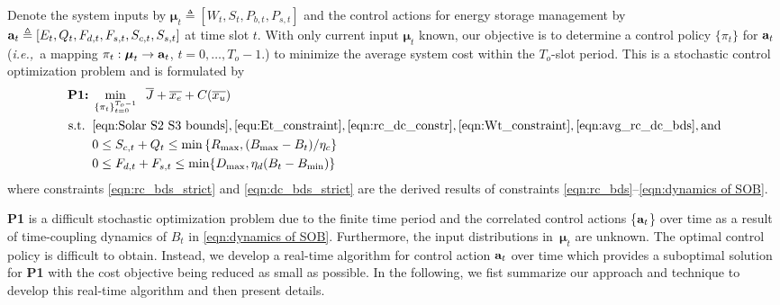 \documentclass[journal]{IEEEtran}
\def\mubf{\boldsymbol \mu }
\def\abf{{\bf a}}
\def\ie{{\it i.e.,\ \/}}
\def\nn{\nonumber}
\begin{document}
Denote the system inputs by $\mubf_t\triangleq[W_t,S_t,P_{b,t},P_{s,t}]$ and the control actions for energy storage management by $\abf_t\triangleq[E_t,Q_t,F_{d,t},F_{s,t},S_{c,t},S_{s,t}]$ at time slot $t$. With only current input  $\mubf_t$ known, our objective is to determine a control policy $\{\pi_t\}$ for  $\abf_t$ (\ie a mapping $\pi_t:\mubf_t\rightarrow \abf_t$, $t=0,\ldots,T_o-1$.) to minimize the average system cost within the $T_o$-slot period. This is a stochastic control optimization problem and is formulated by
\begin{align}
\textrm{\bf P1:}\; &\min_{\{\pi_t\}_{t=0}^{T_o-1}} \;\;
\overline{J}+\overline{x_e}+C(\overline{x_u})\nn\\
\rm{s.t.} \;\;&
\eqref{eqn:Solar S2 S3 bounds},\eqref{equ:Et_constraint},\eqref{eqn:rc_dc_constr},\eqref{eqn:Wt_constraint},\eqref{eqn:avg_rc_dc_bds},\textnormal{and} \nonumber\\
&0\leq S_{c,t}+Q_t\leq \min\left\{R_{\max},(B_{\max}-B_t)/\eta_c\right\}\label{eqn:rc_bds_strict}\\
&0\leq F_{d,t}+F_{s,t} \leq \min\{D_{\max},\eta_d(B_t-B_{\min})\}\label{eqn:dc_bds_strict}
\end{align}
where constraints \eqref{eqn:rc_bds_strict} and \eqref{eqn:dc_bds_strict} are the derived results of  constraints \eqref{eqn:rc_bds}--\eqref{eqn:dynamics of SOB}.

{\bf  P1} is a difficult stochastic  optimization problem due to the finite time period and the correlated control actions \{$\abf_t$\} over time as a result of time-coupling dynamics of $B_t$ in  \eqref{eqn:dynamics of SOB}. Furthermore, the input distributions in\ $\mubf_t$ are unknown. The optimal control policy is difficult to obtain. Instead, we develop a real-time  algorithm for  control action $\abf_t$ over time which provides a suboptimal solution for {\bf P1} with  the cost objective being reduced as small as possible. In the following, we fist summarize our approach and technique to develop this real-time algorithm and then present details.
\end{document}
